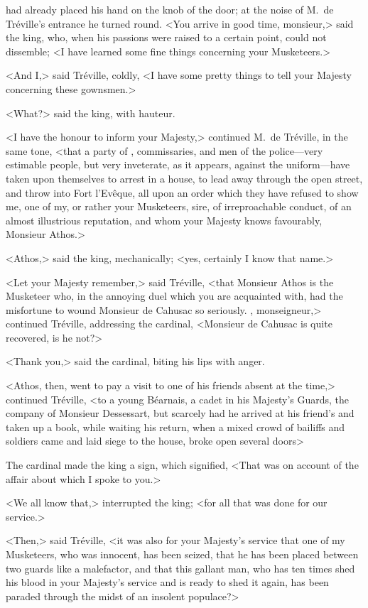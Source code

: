  had already placed his hand on the knob of the door; at the noise of M.~de Tréville's entrance he turned round. <You arrive in good time, monsieur,> said the king, who, when his passions were raised to a certain point, could not dissemble; <I have learned some fine things concerning your Musketeers.> 

<And I,> said Tréville, coldly, <I have some pretty things to tell your Majesty concerning these gownsmen.> 

<What?> said the king, with hauteur. 

<I have the honour to inform your Majesty,> continued M.~de Tréville, in the same tone, <that a party of , commissaries, and men of the police—very estimable people, but very inveterate, as it appears, against the uniform—have taken upon themselves to arrest in a house, to lead away through the open street, and throw into Fort l'Evêque, all upon an order which they have refused to show me, one of my, or rather your Musketeers, sire, of irreproachable conduct, of an almost illustrious reputation, and whom your Majesty knows favourably, Monsieur Athos.> 

<Athos,> said the king, mechanically; <yes, certainly I know that name.> 

<Let your Majesty remember,> said Tréville, <that Monsieur Athos is the Musketeer who, in the annoying duel which you are acquainted with, had the misfortune to wound Monsieur de Cahusac so seriously. , monseigneur,> continued Tréville, addressing the cardinal, <Monsieur de Cahusac is quite recovered, is he not?> 

<Thank you,> said the cardinal, biting his lips with anger. 

<Athos, then, went to pay a visit to one of his friends absent at the time,> continued Tréville, <to a young Béarnais, a cadet in his Majesty's Guards, the company of Monsieur Dessessart, but scarcely had he arrived at his friend's and taken up a book, while waiting his return, when a mixed crowd of bailiffs and soldiers came and laid siege to the house, broke open several doors\longdash> 

The cardinal made the king a sign, which signified, <That was on account of the affair about which I spoke to you.> 

<We all know that,> interrupted the king; <for all that was done for our service.> 

<Then,> said Tréville, <it was also for your Majesty's service that one of my Musketeers, who was innocent, has been seized, that he has been placed between two guards like a malefactor, and that this gallant man, who has ten times shed his blood in your Majesty's service and is ready to shed it again, has been paraded through the midst of an insolent populace?> 


